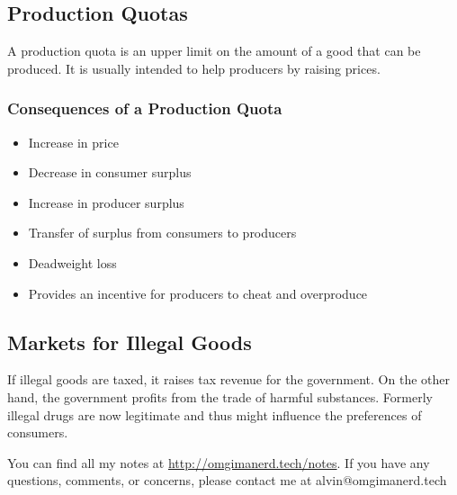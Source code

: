 \documentclass[letterpaper, 12pt]{article}
\begin{document}
\subsection{Production Quotas}
A production quota is an upper limit on the amount of a good that can be
produced. It is usually intended to help producers by raising prices.

\subsubsection{Consequences of a Production Quota}
\begin{itemize}
  \item Increase in price
  \item Decrease in consumer surplus
  \item Increase in producer surplus
  \item Transfer of surplus from consumers to producers
  \item Deadweight loss
  \item Provides an incentive for producers to cheat and overproduce
\end{itemize}

\subsection{Markets for Illegal Goods}
If illegal goods are taxed, it raises tax revenue for the government. On the
other hand, the government profits from the trade of harmful substances.
Formerly illegal drugs are now legitimate and thus might influence the
preferences of consumers.

\begin{center}
  You can find all my notes at \url{http://omgimanerd.tech/notes}. If you have
  any questions, comments, or concerns, please contact me at
  alvin@omgimanerd.tech
\end{center}
\end{document}
